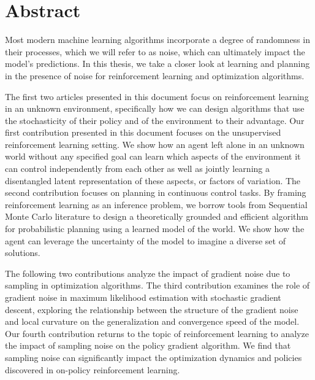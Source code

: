 \chapter*{Abstract}

Most modern machine learning algorithms incorporate a degree of randomness in their processes, which we will refer to as noise, which can ultimately impact the model's predictions. In this thesis, we take a closer look at learning and planning in the presence of noise for reinforcement learning and optimization algorithms.

The first two articles presented in this document focus on reinforcement learning in an unknown environment, specifically how we can design algorithms that use the stochasticity of their policy and of the environment to their advantage.
Our first contribution presented in this document focuses on the unsupervised reinforcement learning setting. We show how an agent left alone in an unknown world without any specified goal can learn which aspects of the environment it can control independently from each other as well as jointly learning a disentangled latent representation of these aspects, or factors of variation.
The second contribution focuses on planning in continuous control tasks. By framing reinforcement learning as an inference problem, we borrow tools from Sequential Monte Carlo literature to design a theoretically grounded and efficient algorithm for probabilistic planning using a learned model of the world. We show how the agent can leverage the uncertainty of the model to imagine a diverse set of solutions.

The following two contributions analyze the impact of gradient noise due to sampling in optimization algorithms. 
The third contribution examines the role of gradient noise in maximum likelihood estimation with stochastic gradient descent, exploring the relationship between the structure of the gradient noise and local curvature on the generalization and convergence speed of the model. 
Our fourth contribution returns to the topic of reinforcement learning to analyze the impact of sampling noise on the policy gradient algorithm. We find that sampling noise can significantly impact the optimization dynamics and policies discovered in on-policy reinforcement learning.











